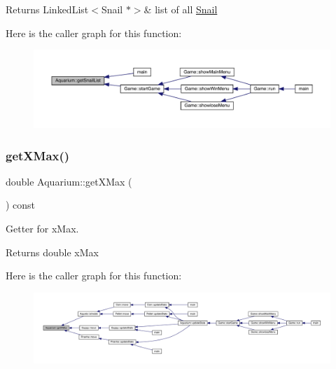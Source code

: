 \begin{DoxyReturn}{Returns}
Linked\+List$<$\+Snail $\ast$$>$\& list of all \mbox{\hyperlink{class_snail}{Snail}} 
\end{DoxyReturn}
Here is the caller graph for this function\+:
\nopagebreak
\begin{figure}[H]
\begin{center}
\leavevmode
\includegraphics[width=350pt]{class_aquarium_a278a38d4cf238908c4e3e170ea66841f_icgraph}
\end{center}
\end{figure}
\mbox{\label{class_aquarium_af0b5f88a7aaf71e817f809d7bee3e51e}} 
\subsubsection{\texorpdfstring{get\+X\+Max()}{getXMax()}}
{\footnotesize\ttfamily double Aquarium\+::get\+X\+Max (\begin{DoxyParamCaption}{ }\end{DoxyParamCaption}) const}



Getter for x\+Max. 

\begin{DoxyReturn}{Returns}
double x\+Max 
\end{DoxyReturn}
Here is the caller graph for this function\+:
\nopagebreak
\begin{figure}[H]
\begin{center}
\leavevmode
\includegraphics[width=350pt]{class_aquarium_af0b5f88a7aaf71e817f809d7bee3e51e_icgraph}
\end{center}
\end{figure}
\mbox{\label{class_aquarium_a3e9e4b1bc86a90a8654bcc76e20e25f1}} 
